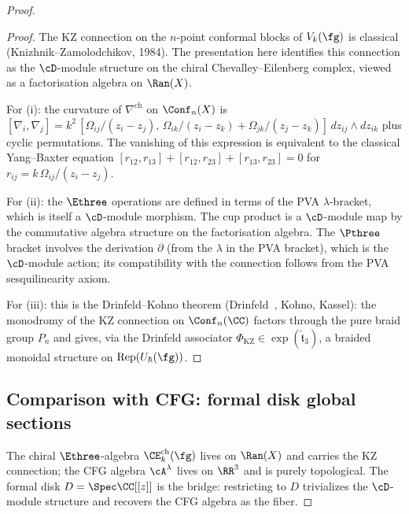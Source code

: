 \begin{proof}
\begin{proof}
The KZ connection on the $n$-point conformal blocks of
$V_k(\fg)$ is classical (Knizhnik--Zamolodchikov, 1984).
The presentation here identifies this connection as the
$\cD$-module structure on the chiral Chevalley--Eilenberg
complex, viewed as a factorisation algebra on $\Ran(X)$.

For (i): the curvature of $\nabla^{\mathrm{ch}}$ on
$\Conf_n(X)$ is
$[\nabla_i, \nabla_j]
= k^2\,[\Omega_{ij}/(z_i-z_j),\,
\Omega_{ik}/(z_i-z_k) + \Omega_{jk}/(z_j-z_k)]
\,dz_{ij} \wedge dz_{ik}$
plus cyclic permutations. The vanishing of this expression
is equivalent to the classical Yang--Baxter equation
$[r_{12}, r_{13}] + [r_{12}, r_{23}] + [r_{13}, r_{23}] = 0$
for $r_{ij} = k\,\Omega_{ij}/(z_i - z_j)$.

For (ii): the $\Ethree$ operations are defined in terms of
the PVA $\lambda$-bracket, which is itself a $\cD$-module
morphism. The cup product is a $\cD$-module map by the
commutative algebra structure on the factorisation algebra.
The $\Pthree$ bracket involves the derivation $\partial$
(from the $\lambda$ in the PVA bracket), which is the
$\cD$-module action; its compatibility with the connection
follows from the PVA sesquilinearity axiom.

For (iii): this is the Drinfeld--Kohno theorem
(Drinfeld~\cite{EK96}, Kohno, Kassel): the monodromy of the
KZ connection on $\Conf_n(\CC)$ factors through the pure
braid group $P_n$ and gives, via the Drinfeld associator
$\Phi_{\mathrm{KZ}} \in \exp(\hat{\mathfrak{t}}_3)$,
a braided monoidal structure on $\mathrm{Rep}(U_\hbar(\fg))$.
\end{proof}

\subsection{Comparison with CFG: formal disk global sections}
\label{subsec:chiral-e3-cfg-comparison}

The chiral $\Ethree$-algebra
$\CE^{\mathrm{ch}}_k(\fg)$ lives on $\Ran(X)$ and
carries the KZ connection; the CFG algebra $\cA^\lambda$
lives on $\RR^3$ and is purely topological. The formal
disk $D = \Spec \CC[[z]]$ is the bridge: restricting to
$D$ trivializes the $\cD$-module structure and recovers the
CFG algebra as the fiber.


\end{proof}
